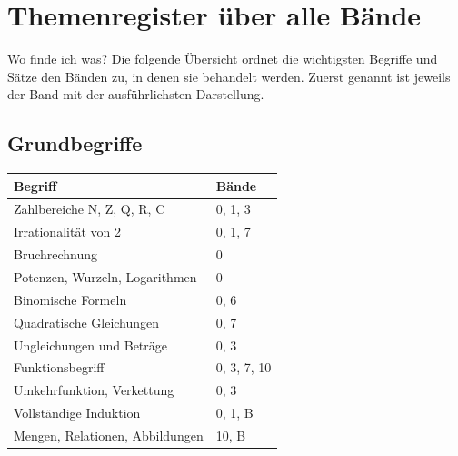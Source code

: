 \chapter{Themenregister über alle Bände}

Wo finde ich was? Die folgende Übersicht ordnet die wichtigsten Begriffe und Sätze den Bänden zu, in denen sie behandelt werden. Zuerst genannt ist jeweils der Band mit der ausführlichsten Darstellung.

\section*{Grundbegriffe}
\nopagebreak
{\small\renewcommand{\arraystretch}{1.32}
\begin{longtable}{@{}P{5.6cm}P{2.8cm}@{}}
\toprule
\textbf{Begriff} & \textbf{Bände}\\
\midrule
\endhead
Zahlbereiche N, Z, Q, R, C & 0, 1, 3\\
Irrationalität von 2 & 0, 1, 7\\
Bruchrechnung & 0\\
Potenzen, Wurzeln, Logarithmen & 0\\
Binomische Formeln & 0, 6\\
Quadratische Gleichungen & 0, 7\\
Ungleichungen und Beträge & 0, 3\\
Funktionsbegriff & 0, 3, 7, 10\\
Umkehrfunktion, Verkettung & 0, 3\\
Vollständige Induktion & 0, 1, B\\
Mengen, Relationen, Abbildungen & 10, B\\
\bottomrule
\end{longtable}}

